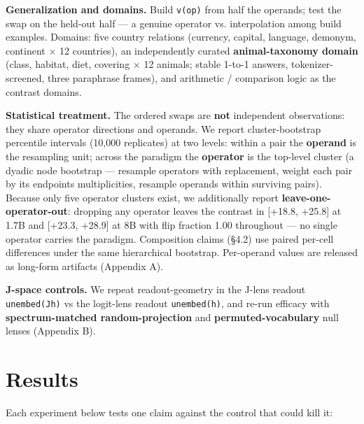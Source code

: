 \textbf{Generalization and domains.} Build \texttt{v(op)} from half the
operands; test the swap on the held-out half --- a genuine operator vs.
interpolation among build examples. Domains: five country relations
(currency, capital, language, demonym, continent \ensuremath{\times} 12 countries), an
independently curated \textbf{animal-taxonomy domain} (class, habitat,
diet, covering \ensuremath{\times} 12 animals; stable 1-to-1 answers, tokenizer-screened,
three paraphrase frames), and arithmetic / comparison logic as the
contrast domains.

\textbf{Statistical treatment.} The ordered swaps are \textbf{not}
independent observations: they share operator directions and operands.
We report cluster-bootstrap percentile intervals (10,000 replicates) at
two levels: within a pair the \textbf{operand} is the resampling unit;
across the paradigm the \textbf{operator} is the top-level cluster (a
dyadic node bootstrap --- resample operators with replacement, weight
each pair by its endpoints\textquotesingle{} multiplicities, resample
operands within surviving pairs). Because only five operator clusters
exist, we additionally report \textbf{leave-one-operator-out}: dropping
any operator leaves the contrast in {[}+18.8, +25.8{]} at 1.7B and
{[}+23.3, +28.9{]} at 8B with flip fraction 1.00 throughout --- no
single operator carries the paradigm. Composition claims (\S{}4.2) use
paired per-cell differences under the same hierarchical bootstrap.
Per-operand values are released as long-form artifacts (Appendix A).

\textbf{J-space controls.} We repeat readout-geometry in the J-lens
readout \texttt{unembed(J\textperiodcentered{}h)} vs the logit-lens readout
\texttt{unembed(h)}, and re-run efficacy with \textbf{spectrum-matched
random-projection} and \textbf{permuted-vocabulary} null lenses
(Appendix B).

\section{Results}

Each experiment below tests one claim against the control that could
kill it:

